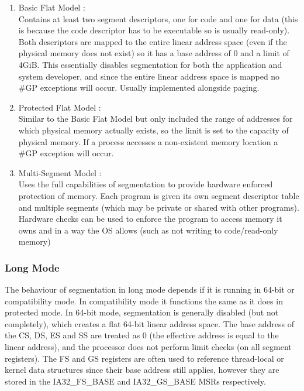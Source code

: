 \documentclass{article}
\newcommand{\layout}[1]{\parbox{\linewidth}{#1}}
\begin{document}
\begin{enumerate}
  \item Basic Flat Model \cite[Chapter~3.2.1]{sdm3}: \\
    Contains at least two segment descriptors, one for code and one for data (this is because the code descriptor has to be executable so is usually read-only).
    Both descriptors are mapped to the entire linear address space (even if the physical memory does not exist) so it has a base address of 0 and a limit of 4GiB.
    This essentially disables segmentation for both the application and system developer, and since the entire linear address space is mapped no \#GP exceptions will occur.
    Usually implemented alongside paging.
  \item Protected Flat Model \cite[Chapter~3.2.2]{sdm3}: \\
    Similar to the Basic Flat Model but only included the range of addresses for which physical memory actually exists, so the limit is set to the capacity of physical memory.
    If a process accesses a non-existent memory location a \#GP exception will occur.
  \item Multi-Segment Model \cite[Chapter~3.2.3]{sdm3}: \\
    Uses the full capabilities of segmentation to provide hardware enforced protection of memory.
    Each program is given its own segment descriptor table and multiple segments (which may be private or shared with other programs).
    Hardware checks can be used to enforce the program to access memory it owns and in a way the OS allows (such as not writing to code/read-only memory)
\end{enumerate}

\layout{
  \subsubsection{Long Mode}

  The behaviour of segmentation in long mode depends if it is running in 64-bit or compatibility mode.
  In compatibility mode it functions the same as it does in protected mode.
  In 64-bit mode, segmentation is generally disabled (but not completely), which creates a flat 64-bit linear address space.
  The base address of the CS, DS, ES and SS are treated as 0 (the effective address is equal to the linear address), and the processor does not perform limit checks (on all segment registers).
  The FS and GS registers are often used to reference thread-local or kernel data structures since their base address still applies, however they are stored in the IA32\_FS\_BASE and IA32\_GS\_BASE MSRs respectively.

  \bigskip \cite[Chapter~3.2.4]{sdm3}
}
\end{document}
